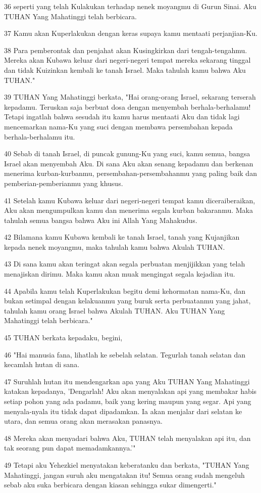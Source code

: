 \par 36 seperti yang telah Kulakukan terhadap nenek moyangmu di Gurun Sinai. Aku TUHAN Yang Mahatinggi telah berbicara.
\par 37 Kamu akan Kuperlakukan dengan keras supaya kamu mentaati perjanjian-Ku.
\par 38 Para pemberontak dan penjahat akan Kusingkirkan dari tengah-tengahmu. Mereka akan Kubawa keluar dari negeri-negeri tempat mereka sekarang tinggal dan tidak Kuizinkan kembali ke tanah Israel. Maka tahulah kamu bahwa Aku TUHAN."
\par 39 TUHAN Yang Mahatinggi berkata, "Hai orang-orang Israel, sekarang terserah kepadamu. Teruskan saja berbuat dosa dengan menyembah berhala-berhalamu! Tetapi ingatlah bahwa sesudah itu kamu harus mentaati Aku dan tidak lagi mencemarkan nama-Ku yang suci dengan membawa persembahan kepada berhala-berhalamu itu.
\par 40 Sebab di tanah Israel, di puncak gunung-Ku yang suci, kamu semua, bangsa Israel akan menyembah Aku. Di sana Aku akan senang kepadamu dan berkenan menerima kurban-kurbanmu, persembahan-persembahanmu yang paling baik dan pemberian-pemberianmu yang khusus.
\par 41 Setelah kamu Kubawa keluar dari negeri-negeri tempat kamu diceraiberaikan, Aku akan mengumpulkan kamu dan menerima segala kurban bakaranmu. Maka tahulah semua bangsa bahwa Aku ini Allah Yang Mahakudus.
\par 42 Bilamana kamu Kubawa kembali ke tanah Israel, tanah yang Kujanjikan kepada nenek moyangmu, maka tahulah kamu bahwa Akulah TUHAN.
\par 43 Di sana kamu akan teringat akan segala perbuatan menjijikkan yang telah menajiskan dirimu. Maka kamu akan muak mengingat segala kejadian itu.
\par 44 Apabila kamu telah Kuperlakukan begitu demi kehormatan nama-Ku, dan bukan setimpal dengan kelakuanmu yang buruk serta perbuatanmu yang jahat, tahulah kamu orang Israel bahwa Akulah TUHAN. Aku TUHAN Yang Mahatinggi telah berbicara."
\par 45 TUHAN berkata kepadaku, begini,
\par 46 "Hai manusia fana, lihatlah ke sebelah selatan. Tegurlah tanah selatan dan kecamlah hutan di sana.
\par 47 Suruhlah hutan itu mendengarkan apa yang Aku TUHAN Yang Mahatinggi katakan kepadanya, 'Dengarlah! Aku akan menyalakan api yang membakar habis setiap pohon yang ada padamu, baik yang kering maupun yang segar. Api yang menyala-nyala itu tidak dapat dipadamkan. Ia akan menjalar dari selatan ke utara, dan semua orang akan merasakan panasnya.
\par 48 Mereka akan menyadari bahwa Aku, TUHAN telah menyalakan api itu, dan tak seorang pun dapat memadamkannya.'"
\par 49 Tetapi aku Yehezkiel menyatakan keberatanku dan berkata, "TUHAN Yang Mahatinggi, jangan suruh aku mengatakan itu! Semua orang sudah mengeluh sebab aku suka berbicara dengan kiasan sehingga sukar dimengerti."

